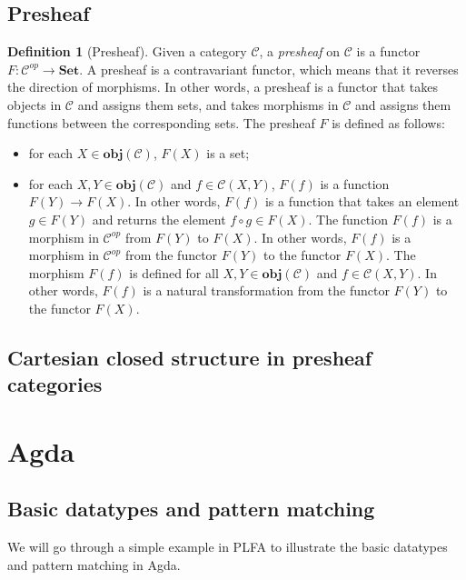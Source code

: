 \documentclass[12pt,twoside,a4paper]{report}
\theoremstyle{definition}
\newtheorem*{definition*}{Definition}
\begin{document}
        \subsection{Presheaf}
        \begin{definition*}[Presheaf]
            Given a category $\mathcal{C}$, a \emph{presheaf} on $\mathcal{C}$ is a functor $F: \mathcal{C}^{op} \to \textbf{Set}$.
            A presheaf is a contravariant functor, which means that it reverses the direction of morphisms.
            In other words, a presheaf is a functor that takes objects in $\mathcal{C}$ and assigns them sets, and takes morphisms in $\mathcal{C}$ and assigns them functions between the corresponding sets.
            The presheaf $F$ is defined as follows:
            \begin{itemize}
                \item 
                    for each $X \in \textbf{obj}(\mathcal{C})$, $F(X)$ is a set;
                \item
                    for each $X, Y \in \textbf{obj}(\mathcal{C})$ and $f \in \mathcal{C}{(X,Y)}$, $F(f)$ is a function $F(Y) \to F(X)$.
                    In other words, $F(f)$ is a function that takes an element $g \in F(Y)$ and returns the element $f \circ g \in F(X)$.
                    The function $F(f)$ is a morphism in $\mathcal{C}^{op}$ from $F(Y)$ to $F(X)$.
                    In other words, $F(f)$ is a morphism in $\mathcal{C}^{op}$ from the functor $F(Y)$ to the functor $F(X)$.
                    The morphism $F(f)$ is defined for all $X, Y \in \textbf{obj}(\mathcal{C})$ and $f \in \mathcal{C}{(X,Y)}$.
                    In other words, $F(f)$ is a natural transformation from the functor $F(Y)$ to the functor $F(X)$.
            \end{itemize}
        \end{definition*}

        \subsection{Cartesian closed structure in presheaf categories}
        


    \section{Agda}
        \subsection{Basic datatypes and pattern matching}
        We will go through a simple example in PLFA \cite{plfa} to illustrate the basic datatypes and pattern matching in Agda.
\end{document}
